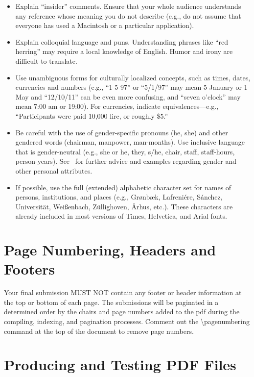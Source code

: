 \documentclass{scsPaperFormattingTemplate-LaTex-Revised20160302}
\begin{document}
\begin{itemize}
\item Explain ``insider'' comments. Ensure that your whole audience understands any reference whose meaning you do not describe (e.g., do not assume that everyone has used a Macintosh or a particular application).
\item Explain colloquial language and puns. Understanding phrases like ``red herring'' may require a local knowledge of English. Humor and irony are difficult to translate.
\item Use unambiguous forms for culturally localized concepts, such as times, dates, currencies and numbers (e.g., ``1-5-97'' or ``5/1/97'' may mean 5 January or 1 May and ``12/10/11'' can be even more confusing, and ``seven o'clock'' may mean 7:00 am or 19:00).  For currencies, indicate equivalences---e.g., ``Participants were paid 10,000 lire, or roughly \$5.''
\item Be careful with the use of gender-specific pronouns (he, she) and other gendered words (chairman, manpower, man-months). Use inclusive language that is gender-neutral (e.g., she or he, they, s/he, chair, staff, staff-hours, person-years). See~\cite{Schwartz:1995:GBF} for further advice and examples regarding gender and other personal attributes.
\item If possible, use the full (extended) alphabetic character set for names of persons, institutions, and places (e.g., Gr{\o}nb{\ae}k, Lafreni\'ere, S\'anchez, Universit{\"a}t, Wei{\ss}enbach, Z{\"u}llighoven, \r{A}rhus, etc.).  These characters are already included in most versions of Times, Helvetica, and Arial fonts.
\end{itemize}

\section{Page Numbering, Headers and Footers}

Your final submission MUST NOT contain any footer or header information at the top or bottom of each page. The submissions will be paginated in a determined order by the chairs and page numbers added to the pdf during the compiling, indexing, and pagination processes. Comment out the {\textbackslash}pagenumbering command at the top of the document to remove page numbers.

\section{Producing and Testing PDF Files}
\end{document}
